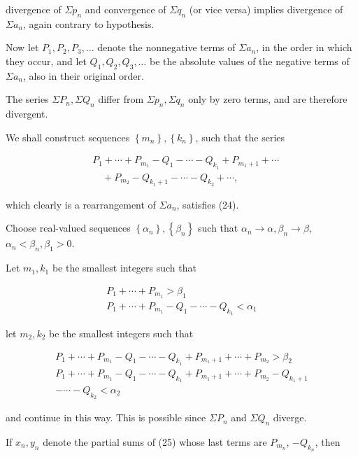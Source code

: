 \documentclass[10pt]{article}
\begin{document}
divergence of $\Sigma p_{n}$ and convergence of $\Sigma q_{n}$ (or vice versa) implies divergence of $\Sigma a_{n}$, again contrary to hypothesis.

Now let $P_{1}, P_{2}, P_{3}, \ldots$ denote the nonnegative terms of $\Sigma a_{n}$, in the order in which they occur, and let $Q_{1}, Q_{2}, Q_{3}, \ldots$ be the absolute values of the negative terms of $\Sigma a_{n}$, also in their original order.

The series $\Sigma P_{n}, \Sigma Q_{n}$ differ from $\Sigma p_{n}, \Sigma q_{n}$ only by zero terms, and are therefore divergent.

We shall construct sequences $\left\{m_{n}\right\},\left\{k_{n}\right\}$, such that the series

$$
\begin{aligned}
& P_{1}+\cdots+P_{m_{1}}-Q_{1}-\cdots-Q_{k_{1}}+P_{m_{1}+1}+\cdots \\
& \quad+P_{m_{2}}-Q_{k_{1}+1}-\cdots-Q_{k_{2}}+\cdots,
\end{aligned}
$$

which clearly is a rearrangement of $\Sigma a_{n}$, satisfies (24).

Choose real-valued sequences $\left\{\alpha_{n}\right\},\left\{\beta_{n}\right\}$ such that $\alpha_{n} \rightarrow \alpha, \beta_{n} \rightarrow \beta$, $\alpha_{n}<\beta_{n}, \beta_{1}>0$.

Let $m_{1}, k_{1}$ be the smallest integers such that

$$
\begin{gathered}
P_{1}+\cdots+P_{m_{1}}>\beta_{1} \\
P_{1}+\cdots+P_{m_{1}}-Q_{1}-\cdots-Q_{k_{1}}<\alpha_{1}
\end{gathered}
$$

let $m_{2}, k_{2}$ be the smallest integers such that

$$
\begin{array}{r}
P_{1}+\cdots+P_{m_{1}}-Q_{1}-\cdots-Q_{k_{1}}+P_{m_{1}+1}+\cdots+P_{m_{2}}>\beta_{2} \\
P_{1}+\cdots+P_{m_{1}}-Q_{1}-\cdots-Q_{k_{1}}+P_{m_{1}+1}+\cdots+P_{m_{2}}-Q_{k_{1}+1} \\
-\cdots-Q_{k_{2}}<\alpha_{2}
\end{array}
$$

and continue in this way. This is possible since $\Sigma P_{n}$ and $\Sigma Q_{n}$ diverge.

If $x_{n}, y_{n}$ denote the partial sums of (25) whose last terms are $P_{m_{n}}$, $-Q_{k_{n}}$, then
\end{document}
